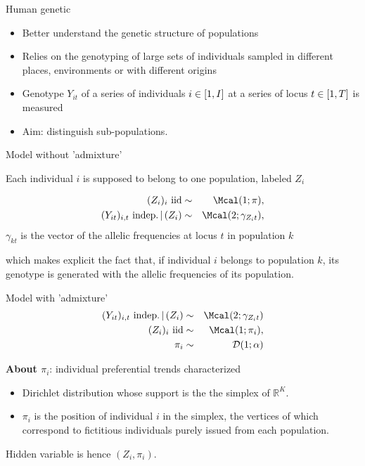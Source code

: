 \documentclass[compress,10pt]{beamer}
\begin{document}
\begin{frame}{Human genetic}

\begin{itemize}
 \item Better understand the genetic structure of populations
 \item Relies on the genotyping of large sets of individuals sampled in different places, environments or with different origins
 \item Genotype $Y_{it}$ of a series of individuals $i \in \interval{1}{I}$ at a series of locus $t \in \interval{1}{T}$ is measured
 \item \textcolor{dgreen}{Aim}: distinguish sub-populations.
\end{itemize}

\end{frame}
\begin{frame}{Model without 'admixture'}

Each individual $i$ is supposed to belong to one population, labeled $Z_i$

 \begin{eqnarray*}
 (Z_i)_i \text{ iid} & \sim & \Mcal(1; \pi), \\
 (Y_{it})_{i, t} \text{ indep.} \,|\, (Z_i) & \sim & \Mcal(2; \gamma_{Z_it}),
\end{eqnarray*}
$\gamma_{kt}$ is the vector of the allelic frequencies at locus $t$ in population $k$

which makes explicit the fact that, if individual $i$ belongs to population $k$, its genotype is generated with the allelic frequencies of its population.
\end{frame}



\begin{frame}{Model with  'admixture'}
\begin{eqnarray*}
 (Y_{it})_{i, t} \text{ indep.} \,|\, (Z_i) & \sim & \Mcal(2; \gamma_{Z_it})\\
 (Z_i)_i \text{ iid} & \sim & \Mcal(1; \pi_i), \\
\pi_i  & \sim & \mathcal{D}(1; \alpha)
\end{eqnarray*} 

\textbf{About $\pi_i$}: individual preferential trends characterized
\begin{itemize}
  \item Dirichlet distribution whose support is the the simplex of $\mathbb{R}^K$.
 \item $\pi_i$ is the position of individual $i$ in the simplex, the vertices of which correspond to fictitious individuals purely issued from each population. 
 \end{itemize}
 
Hidden variable is hence $ (Z_i, \pi_i)$. 
\end{frame}
 
\end{document}
